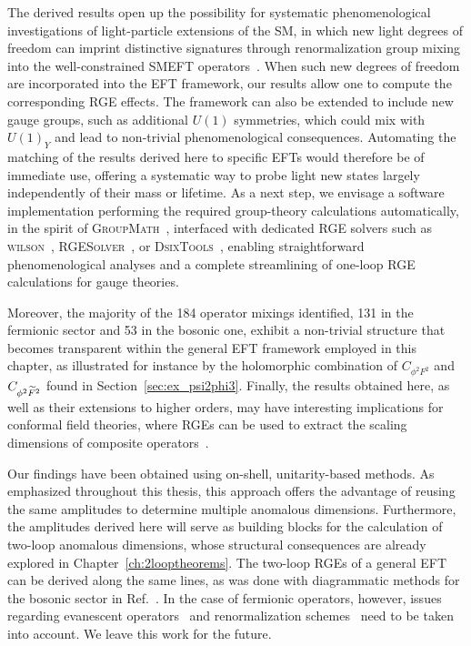 The derived results open up the possibility for systematic phenomenological investigations of
light-particle extensions of the SM, in which new light degrees of freedom can imprint distinctive
signatures through renormalization group mixing into the well-constrained SMEFT
operators~\cite{Galda:2021hbr}. When such new degrees of freedom are incorporated into the EFT
framework, our results allow one to compute the corresponding RGE effects. The framework can also be
extended to include new gauge groups, such as additional $U(1)$ symmetries, which could mix with
$U(1)_Y$ and lead to non-trivial phenomenological consequences. Automating the matching of the
results derived here to specific EFTs would therefore be of immediate use, offering a systematic way
to probe light new states largely independently of their mass or lifetime. As a next step, we
envisage a software implementation performing the required group-theory calculations automatically,
in the spirit of \textsc{GroupMath}~\cite{Fonseca:2020vke}, interfaced with dedicated RGE solvers
such as \textsc{wilson}~\cite{Aebischer:2018bkb}, \textsc{RGESolver}~\cite{DiNoi:2022ejg}, or
\textsc{DsixTools}~\cite{Celis:2017hod,Fuentes-Martin:2020zaz}, enabling straightforward
phenomenological analyses and a complete streamlining of one-loop RGE calculations for gauge
theories.

Moreover, the majority of the 184 operator mixings identified, 131 in the fermionic sector and 53 in
the bosonic one, exhibit a non-trivial structure that becomes transparent within the general EFT
framework employed in this chapter, as illustrated for instance by the holomorphic combination of
$C_{\phi^2F^2}$ and $C_{\phi^2\widetilde{F}^2}$ found in Section~\ref{sec:ex_psi2phi3}.
Finally,
the results obtained here, as well as their extensions to higher orders, may have interesting
implications for conformal field theories, where RGEs can be used to extract the scaling dimensions
of composite operators~\cite{Henriksson:2025hwi}.

Our findings have been obtained using on-shell, unitarity-based methods. As emphasized
throughout this thesis, this approach offers the advantage of reusing the same amplitudes to
determine multiple anomalous dimensions. Furthermore, the amplitudes derived here will serve as
building blocks for the calculation of two-loop anomalous dimensions, whose structural consequences
are already explored in Chapter~\ref{ch:2looptheorems}. The two-loop RGEs of a general EFT can be
derived along the same lines, as was done with diagrammatic methods for the bosonic sector in
Ref.~\cite{Guedes:2025sax}. In the case of fermionic operators, however, issues regarding evanescent
operators~\cite{Dugan:1990df,Herrlich:1994kh,Aebischer:2022aze,Aebischer:2022rxf} and
renormalization schemes~\cite{Aebischer:2023djt,Aebischer:2024xnf} need to be taken into account. We
leave this work for the future.